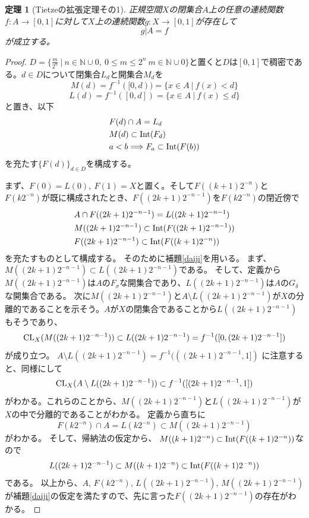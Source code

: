 \documentclass[leqno]{jsarticle}
\newtheorem{thm}{定理}
\newcommand{\To}{\Longrightarrow}
\newcommand{\nn}{\mathbb{N}}
\newcommand{\dpst}{\displaystyle}
\newcommand{\cl}{\text{{\rm CL}} }
\newcommand{\nai}{\text{{\rm Int}} }
\begin{document}
\setcounter{equation}{0}
\begin{thm}[Tietzeの拡張定理その1]
正規空間$X$の閉集合$A$上の任意の連続関数$f:A\to [0,1]$に対して$X$上の連続関数$g:X\to [0,1]$が存在して
\[
g|A=f
\]
が成立する。
\end{thm}
\begin{proof}
$\dpst D=\{\frac{m}{2^n}\ |\ n\in \nn\cup{0},\ 0\le m\le 2^n\ m\in \nn\cup{0}\}$と置くと$D$は$[0,1]$で稠密である。$d\in D$について閉集合$L_d$と開集合$M_d$を
\[
M(d)=f^{-1}([0,d))=\{x\in A\ |\ f(x)< d\}
\]
\[
L(d)=f^{-1}([0,d])=\{x\in A\ |\ f(x)\le d\}
\]
と置き、以下
\begin{align}
&F(d)\cap A=L_d\\ 
&M(d)\subset \nai(F_d)\\
&a<b\To F_a\subset \nai(F(b))
\end{align}
を充たす$\{F(d)\}_{d\in D}$を構成する。\par 
まず、$F(0)=L(0),\ F(1)=X$と置く。そして$F((k+1)2^{-n})$と
$F(k2^{-n})$が既に構成されたとき、$F((2k+1)2^{-n-1})$を$F(k2^{-n})$の閉近傍で
\setcounter{equation}{0}
\begin{align}
&A\cap F((2k+1)2^{-n-1})=L((2k+1)2^{-n-1})\\
&M((2k+1)2^{-n-1})\subset \nai(F((2k+1)2^{-n-1}))\\
&F((2k+1)2^{-n-1})\subset \nai(F((k+1)2^{-n}))
\end{align}
を充たすものとして構成する。
そのために補題\ref{daiji}を用いる。
まず、
$M((2k+1)2^{-n-1})\subset L((2k+1)2^{-n-1})$である。
そして、定義から$M((2k+1)2^{-n-1})$は$A$の$F_{\sigma}$な開集合であり、$L((2k+1)2^{-n-1})$は$A$の$G_{\delta}$な開集合である。
次に$M((2k+1)2^{-n-1})$と$A\setminus L((2k+1)2^{-n-1})$が$X$の分離的であることを示そう。$A$が$X$の閉集合であることから$L((2k+1)2^{-n-1})$もそうであり、
\[
\cl_X(M((2k+1)2^{-n-1}))\subset L((2k+1)2^{-n-1})=f^{-1}([0, (2k+1)2^{-n-1}])
\]
が成り立つ。
$A\setminus L((2k+1)2^{-n-1})=f^{-1}(((2k+1)2^{-n-1}, 1])$
に注意すると、同様にして
\[
\cl_X(A\setminus L((2k+1)2^{-n-1}))\subset f^{-1}([(2k+1)2^{-n-1}, 1])
\]
がわかる。これらのことから、$M((2k+1)2^{-n-1})$と$L((2k+1)2^{-n-1})$が
$X$の中で分離的であることがわかる。
定義から直ちに
\[
F(k2^{-n})\cap A=L(k2^{-n})\subset M((2k+1)2^{-n-1})
\]
がわかる。
そして、帰納法の仮定から、
$M((k+1)2^{-n})\subset \nai(F((k+1)2^{-n}))$なので
\[
L((2k+1)2^{-n-1})\subset M((k+1)2^{-n})\subset \nai(F((k+1)2^{-n}))
\]
である。
以上から、$A$, $F(k2^{-n})$, $L((2k+1)2^{-n-1})$, $M((2k+1)2^{-n-1})$が補題\ref{daiji}の仮定を満たすので、先に言った$F((2k+1)2^{-n-1})$の存在がわかる。

\end{proof}
\end{document}
